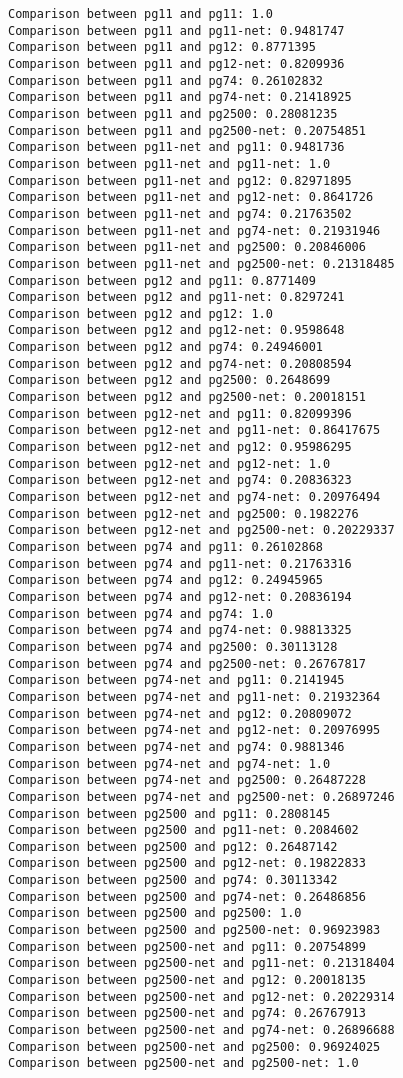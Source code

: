 \documentclass{article}
\begin{document}
\begin{verbatim}
Comparison between pg11 and pg11: 1.0
Comparison between pg11 and pg11-net: 0.9481747
Comparison between pg11 and pg12: 0.8771395
Comparison between pg11 and pg12-net: 0.8209936
Comparison between pg11 and pg74: 0.26102832
Comparison between pg11 and pg74-net: 0.21418925
Comparison between pg11 and pg2500: 0.28081235
Comparison between pg11 and pg2500-net: 0.20754851
Comparison between pg11-net and pg11: 0.9481736
Comparison between pg11-net and pg11-net: 1.0
Comparison between pg11-net and pg12: 0.82971895
Comparison between pg11-net and pg12-net: 0.8641726
Comparison between pg11-net and pg74: 0.21763502
Comparison between pg11-net and pg74-net: 0.21931946
Comparison between pg11-net and pg2500: 0.20846006
Comparison between pg11-net and pg2500-net: 0.21318485
Comparison between pg12 and pg11: 0.8771409
Comparison between pg12 and pg11-net: 0.8297241
Comparison between pg12 and pg12: 1.0
Comparison between pg12 and pg12-net: 0.9598648
Comparison between pg12 and pg74: 0.24946001
Comparison between pg12 and pg74-net: 0.20808594
Comparison between pg12 and pg2500: 0.2648699
Comparison between pg12 and pg2500-net: 0.20018151
Comparison between pg12-net and pg11: 0.82099396
Comparison between pg12-net and pg11-net: 0.86417675
Comparison between pg12-net and pg12: 0.95986295
Comparison between pg12-net and pg12-net: 1.0
Comparison between pg12-net and pg74: 0.20836323
Comparison between pg12-net and pg74-net: 0.20976494
Comparison between pg12-net and pg2500: 0.1982276
Comparison between pg12-net and pg2500-net: 0.20229337
Comparison between pg74 and pg11: 0.26102868
Comparison between pg74 and pg11-net: 0.21763316
Comparison between pg74 and pg12: 0.24945965
Comparison between pg74 and pg12-net: 0.20836194
Comparison between pg74 and pg74: 1.0
Comparison between pg74 and pg74-net: 0.98813325
Comparison between pg74 and pg2500: 0.30113128
Comparison between pg74 and pg2500-net: 0.26767817
Comparison between pg74-net and pg11: 0.2141945
Comparison between pg74-net and pg11-net: 0.21932364
Comparison between pg74-net and pg12: 0.20809072
Comparison between pg74-net and pg12-net: 0.20976995
Comparison between pg74-net and pg74: 0.9881346
Comparison between pg74-net and pg74-net: 1.0
Comparison between pg74-net and pg2500: 0.26487228
Comparison between pg74-net and pg2500-net: 0.26897246
Comparison between pg2500 and pg11: 0.2808145
Comparison between pg2500 and pg11-net: 0.2084602
Comparison between pg2500 and pg12: 0.26487142
Comparison between pg2500 and pg12-net: 0.19822833
Comparison between pg2500 and pg74: 0.30113342
Comparison between pg2500 and pg74-net: 0.26486856
Comparison between pg2500 and pg2500: 1.0
Comparison between pg2500 and pg2500-net: 0.96923983
Comparison between pg2500-net and pg11: 0.20754899
Comparison between pg2500-net and pg11-net: 0.21318404
Comparison between pg2500-net and pg12: 0.20018135
Comparison between pg2500-net and pg12-net: 0.20229314
Comparison between pg2500-net and pg74: 0.26767913
Comparison between pg2500-net and pg74-net: 0.26896688
Comparison between pg2500-net and pg2500: 0.96924025
Comparison between pg2500-net and pg2500-net: 1.0
\end{verbatim}
\end{document}
